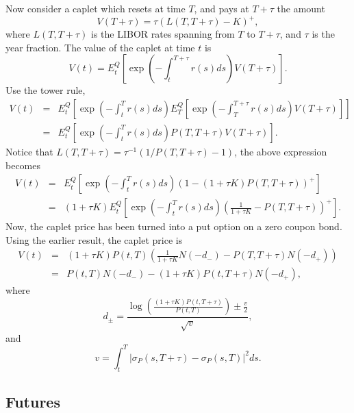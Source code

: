 \documentclass[12pt]{article}
\begin{document}
    Now consider a caplet which resets at time $T$, and pays at $T+\tau$ the amount
    \begin{equation}
      V(T+\tau) = \tau\left(L(T,T+\tau)-K\right)^+,
    \end{equation}
    where $L(T,T+\tau)$ is the LIBOR rates spanning from $T$ to $T+\tau$, and $\tau$
    is the year fraction. The value of the caplet at time $t$ is
    \begin{equation}
      V(t)=E_t^Q\left[\exp\left(-\int_t^{T+\tau}r(s)ds\right)V(T+\tau)\right].
    \end{equation}
    Use the tower rule,
    \begin{eqnarray}
      V(t)&=&E_t^Q\left[\exp\left(-\int_t^{T}r(s)ds\right)E_T^Q\left[\exp\left(-\int_T^{T+\tau}r(s)ds\right)V(T+\tau)\right]\right]\nonumber\\
          &=&E_t^Q\left[\exp\left(-\int_t^{T}r(s)ds\right)P(T,T+\tau)V(T+\tau)\right].
    \end{eqnarray}
    Notice that $L(T,T+\tau)=\tau^{-1}(1/P(T,T+\tau)-1)$, the above expression becomes
    \begin{eqnarray}
      V(t)&=&E_t^Q\left[\exp\left(-\int_t^{T}r(s)ds\right)\left(1-\left(1+\tau K\right)P(T,T+\tau)\right)^+\right]\nonumber\\
          &=&(1+\tau K)E_t^Q\left[\exp\left(-\int_t^{T}r(s)ds\right)\left(\frac{1}{1+\tau K}-P(T,T+\tau)\right)^+\right].
    \end{eqnarray}
    Now, the caplet price has been turned into a put option on a zero coupon bond. Using the earlier result, the caplet price is
    \begin{eqnarray}
      V(t)&=&(1+\tau K)P(t,T)\left(\frac{1}{1+\tau K}N(-d_-)-P(T,T+\tau)N(-d_+)\right)\nonumber\\
          &=&P(t,T)N(-d_-)-(1+\tau K)P(t,T+\tau)N(-d_+),
    \end{eqnarray}
    where
    \begin{equation}
      d_{\pm} = \frac{\displaystyle\log\left(\frac{(1+\tau K)P(t,T+\tau)}{P(t,T)}\right)\pm \frac{v}{2}}{\sqrt{v}},
    \end{equation}
    and
    \begin{equation}
      v=\int_t^T\left|\sigma_P(s,T+\tau)-\sigma_P(s,T)\right|^2ds.
    \end{equation}

  \subsection{Futures}
\end{document}
